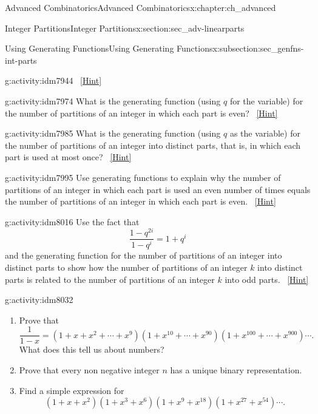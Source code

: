 \documentclass[oneside,10pt,]{book}
\numberwithin{equation}{chapter}
\begin{document}
\begin{chapterptx}{Advanced Combinatorics}{}{Advanced Combinatorics}{}{}{x:chapter:ch_advanced}
\begin{sectionptx}{Integer Partitions}{}{Integer Partitions}{}{}{x:section:sec_adv-linearparts}
\begin{subsectionptx}{Using Generating Functions}{}{Using Generating Functions}{}{}{x:subsection:sec_genfns-int-parts}
\begin{activity}{}{g:activity:idm7944}
\qquad~\hfill{\tiny\hyperlink{g:hint:idm7955-back}{[Hint]}}\end{activity}
\begin{activity}{}{g:activity:idm7974}%
What is the generating function (using \(q\) for the variable) for the number of partitions of an integer in which each part is even?%
\qquad~\hfill{\tiny\hyperlink{g:hint:idm7978-back}{[Hint]}}\end{activity}
\begin{activity}{}{g:activity:idm7985}%
What is the generating function (using \(q\) as the variable) for the number of partitions of an integer into distinct parts, that is, in which each part is used at most once?%
\qquad~\hfill{\tiny\hyperlink{g:hint:idm7989-back}{[Hint]}}\end{activity}
\begin{activity}{}{g:activity:idm7995}%
Use generating functions to explain why the number of partitions of an integer in which each part is used an even number of times equals the number of partitions of an integer in which each part is even.%
\qquad~\hfill{\tiny\hyperlink{g:hint:idm7998-back}{[Hint]}}\end{activity}
\begin{activity}{}{g:activity:idm8016}%
Use the fact that%
\begin{equation*}
\frac{1-q^{2i}}{1-q^i}= 1+q^i
\end{equation*}
and the generating function for the number of partitions of an integer into distinct parts to show how the number of partitions of an integer \(k\) into distinct parts is related to the number of partitions of an integer \(k\) into odd parts.%
\qquad~\hfill{\tiny\hyperlink{g:hint:idm8022-back}{[Hint]}}\end{activity}
\begin{activity}{}{g:activity:idm8032}%
\begin{enumerate}[font=\bfseries,label=(\alph*),ref=\alph*]
\item{}Prove that%
\begin{equation*}
\frac{1}{1-x} = (1 + x + x^2 +\cdots + x^9)(1 + x^{10} + \cdots + x^{90})(1 + x^{100} + \cdots + x^{900})\cdots.
\end{equation*}
What does this tell us about numbers?%
\item{}Prove that every non negative integer \(n\) has a unique binary representation.%
\item{}Find a simple expression for%
\begin{equation*}
(1+x+x^2)(1+x^3+x^6)(1+x^9+x^{18})(1+x^{27}+x^{54})\cdots.

\end{equation*}
\end{enumerate}
\end{activity}
\end{subsectionptx}
\end{sectionptx}
\end{chapterptx}
\end{document}
